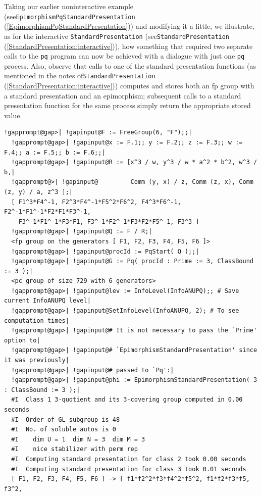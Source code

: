 \documentclass[a4paper,11pt]{report}
\begin{document}
{{{ Taking our earlier non\texttt{}interactive example
(see{\nobreakspace}\texttt{EpimorphismPqStandardPresentation} (\ref{EpimorphismPqStandardPresentation})) and modifying it a little, we illustrate, as for the interactive \texttt{StandardPresentation} (see{\nobreakspace}\texttt{StandardPresentation} (\ref{StandardPresentation:interactive})), how something that required two separate calls to the \texttt{pq} program can now be achieved with a dialogue with just one \texttt{pq} process. Also, observe that calls to one of the standard presentation
functions (as mentioned in the notes of{\nobreakspace}\texttt{StandardPresentation} (\ref{StandardPresentation:interactive})) computes and stores both an fp group with a standard presentation and an
epimorphism; subsequent calls to a standard presentation function for the same
process simply return the appropriate stored value.  
\begin{Verbatim}[commandchars=!@|,fontsize=\small,frame=single,label=Example]
  !gapprompt@gap>| !gapinput@F := FreeGroup(6, "F");;|
  !gapprompt@gap>| !gapinput@x := F.1;; y := F.2;; z := F.3;; w := F.4;; a := F.5;; b := F.6;;|
  !gapprompt@gap>| !gapinput@R := [x^3 / w, y^3 / w * a^2 * b^2, w^3 / b,|
  !gapprompt@>| !gapinput@         Comm (y, x) / z, Comm (z, x), Comm (z, y) / a, z^3 ];|
  [ F1^3*F4^-1, F2^3*F4^-1*F5^2*F6^2, F4^3*F6^-1, F2^-1*F1^-1*F2*F1*F3^-1, 
    F3^-1*F1^-1*F3*F1, F3^-1*F2^-1*F3*F2*F5^-1, F3^3 ]
  !gapprompt@gap>| !gapinput@Q := F / R;|
  <fp group on the generators [ F1, F2, F3, F4, F5, F6 ]>
  !gapprompt@gap>| !gapinput@procId := PqStart( Q );;|
  !gapprompt@gap>| !gapinput@G := Pq( procId : Prime := 3, ClassBound := 3 );|
  <pc group of size 729 with 6 generators>
  !gapprompt@gap>| !gapinput@lev := InfoLevel(InfoANUPQ);; # Save current InfoANUPQ level|
  !gapprompt@gap>| !gapinput@SetInfoLevel(InfoANUPQ, 2); # To see computation times|
  !gapprompt@gap>| !gapinput@# It is not necessary to pass the `Prime' option to|
  !gapprompt@gap>| !gapinput@# `EpimorphismStandardPresentation' since it was previously|
  !gapprompt@gap>| !gapinput@# passed to `Pq':|
  !gapprompt@gap>| !gapinput@phi := EpimorphismStandardPresentation( 3 : ClassBound := 3 );|
  #I  Class 1 3-quotient and its 3-covering group computed in 0.00 seconds
  #I  Order of GL subgroup is 48
  #I  No. of soluble autos is 0
  #I    dim U = 1  dim N = 3  dim M = 3
  #I    nice stabilizer with perm rep
  #I  Computing standard presentation for class 2 took 0.00 seconds
  #I  Computing standard presentation for class 3 took 0.01 seconds
  [ F1, F2, F3, F4, F5, F6 ] -> [ f1*f2^2*f3*f4^2*f5^2, f1*f2*f3*f5, f3^2, 

\end{Verbatim}}}}
\end{document}

